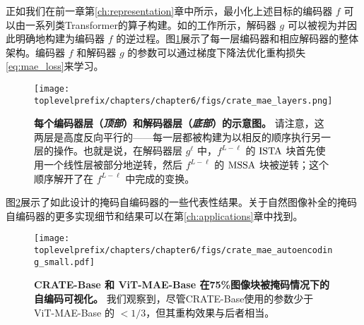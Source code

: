 \documentclass[../../book-main_zh.tex]{subfiles}
\begin{document}
正如我们在前一章第\ref{ch:representation}章中所示，最小化上述目标的编码器 $f$ 可以由一系列类Transformer的算子构建。如\cite{Pai2024masked}的工作所示，解码器 $g$ 可以被视为并因此明确地构建为编码器 $f$ 的逆过程。图\ref{fig:crate_mae_layers}展示了每一层编码器和相应解码器的整体架构。编码器 $f$ 和解码器 $g$ 的参数可以通过梯度下降法优化重构损失\eqref{eq:mae_loss}来学习。

\begin{figure}[t!]
\centering
\texttt{[image: \\toplevelprefix/chapters/chapter6/figs/crate\_mae\_layers.png]}
\caption{\small \textbf{每个编码器层（\textit{顶部}）和解码器层（\textit{底部}）的示意图。} 请注意，这两层是高度反向平行的——每一层都被构建为以相反的顺序执行另一层的操作。也就是说，在解码器层 \(g^{\ell}\) 中，\(f^{L - \ell}\) 的 \(\operatorname{ISTA}\) 块首先使用一个线性层被部分地逆转，然后 \(f^{L - \ell}\) 的 \(\operatorname{MSSA}\) 块被逆转；这个顺序解开了在 \(f^{L - \ell}\) 中完成的变换。}
\label{fig:crate_mae_layers}
\end{figure}

图\ref{fig:mae_autoencoding-small}展示了如此设计的掩码自编码器的一些代表性结果。关于自然图像补全的掩码自编码器的更多实现细节和结果可以在第\ref{ch:applications}章中找到。
\begin{figure}[t]
\centering
\texttt{[image: \\toplevelprefix/chapters/chapter6/figs/crate\_mae\_autoencoding\_small.pdf]}
\caption{\small \textbf{CRATE-Base 和 ViT-MAE-Base \cite{he2022masked} 在75\%图像块被掩码情况下的自编码可视化。} 我们观察到，尽管CRATE-Base使用的参数少于 ViT-MAE-Base 的 \(< 1/3\)，但其重构效果与后者相当。
}
\label{fig:mae_autoencoding-small}
\end{figure}



\end{document}
